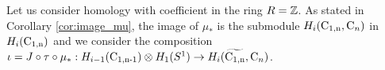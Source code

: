 %	
%
%
%

Let us consider homology with coefficient in the ring $R = \mathbb{Z}$. As stated in Corollary \ref{cor:image_mu}, the image of  $\mu_*$ is the submodule $H_i(\operatorname{C_{1,n}}, \operatorname{C}_n)$ in $H_i(\operatorname{C_{1,n}})$ and we consider the composition $\iota = J \circ \tau \circ \mu_*: H_{i-1}(\operatorname{C_{1,n-1}}) \otimes H_1(S^1) \to H_i(\widetilde{\operatorname{C_{1,n}}}, \operatorname{C}_n)$.



